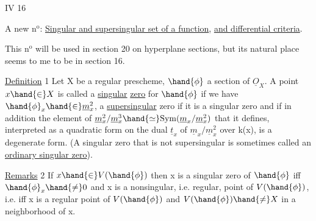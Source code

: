 
IV 16

A new n$^{\text{o}}$: \uline{Singular and supersingular set of a function},
\uline{and differential criteria}.

This n$^{\text{o}}$ will be used in section 20 on hyperplane sections, but its
natural place seems to me to be in section 16.

\uline{Definition} 1 Let X be a regular prescheme, $\hand{\phi}$ a section of $\underline{O}_X$. A
point $x \hand{\in} X$ is called a \uline{singular}  \uline{zero} for $\hand{\phi}$
if we have $\hand{\phi}_x \hand{\in} \underline{m}_x^2$, a \uline{supersingular} zero if it is a singular zero
and if in addition the element of $\underline{m}_x^2/\underline{m}_x^3 \hand{\simeq} \mathrm{Sym}(\underline{m}_x/\underline{m}_x^2)$ that it defines,
interpreted as a quadratic form on the dual $\underline{t}_x$ of $\underline{m}_x/\underline{m}_x^2$ over k(x),
is a degenerate form. (A singular zero that is not supersingular
is sometimes called an \uline{ordinary singular zero}).

\uline{Remarks} 2 If $x \hand{\in} V(\hand{\phi})$\hand{,} then x is a singular zero of $\hand{\phi}$ iff
$\hand{\phi}_x \hand{\neq} 0$ and x is a nonsingular, i.e. regular, point of $V(\hand{\phi})$,
i.e. iff x is a regular point of $V(\hand{\phi})$ and $V(\hand{\phi}) \hand{\neq} X$ in a neighborhood of
x. 

